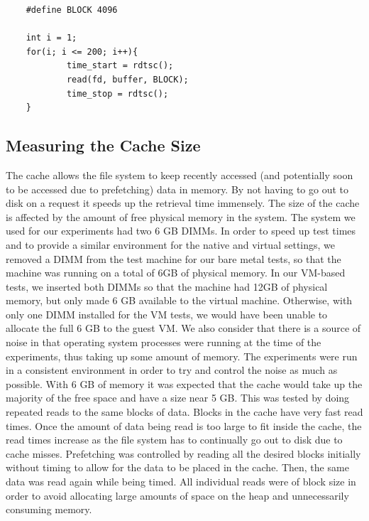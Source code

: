 \documentclass[letterpaper,twocolumn,10pt]{article}
\begin{document}
\begin{verbatim}
    #define BLOCK 4096

    int i = 1;
    for(i; i <= 200; i++){
            time_start = rdtsc();
            read(fd, buffer, BLOCK);
            time_stop = rdtsc();
    }
\end{verbatim}

\subsection{Measuring the Cache Size}
The cache allows the file system to keep recently accessed (and potentially soon to be accessed due to prefetching) data in memory. 
By not having to go out to disk on a request it speeds up the retrieval time immensely. 
The size of the cache is affected by the amount of free physical memory in the system. 
The system we used for our experiments had two 6 GB DIMMs. 
In order to speed up test times and to provide a similar environment for the native and virtual settings, we removed a DIMM from the test machine for our bare metal tests, so that the machine was running on a total of 6GB of physical memory. 
In our VM-based tests, we inserted both DIMMs so that the machine had 12GB of physical memory, but only made 6 GB available to the virtual machine. 
Otherwise, with only one DIMM installed for the VM tests, we would have been unable to allocate the full 6 GB to the guest VM.
We also consider that there is a source of noise in that operating system processes were running at the time of the experiments, thus taking up some amount of memory.
The experiments were run in a consistent environment in order to try and control the noise as much as possible. 
With 6 GB of memory it was expected that the cache would take up the majority of the free space and have a size near 5 GB. 
This was tested by doing repeated reads to the same blocks of data. 
Blocks in the cache have very fast read times. 
Once the amount of data being read is too large to fit inside the cache, the read times increase as the file system has to continually go out to disk due to cache misses. 
Prefetching was controlled by reading all the desired blocks initially without timing to allow for the data to be placed in the cache. 
Then, the same data was read again while being timed. 
All individual reads were of block size in order to avoid allocating large amounts of space on the heap and unnecessarily consuming memory.
\end{document}

